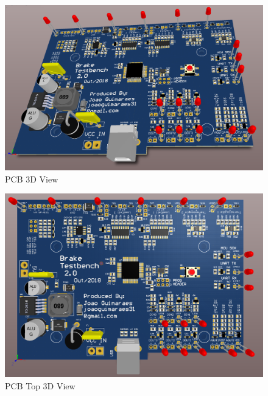 		\begin{figure}[htbp]
			\centering
			\includegraphics[scale=0.7]{figuras/fig-pcb-print-diagonal.png}
			\caption{PCB 3D View}
			\label{fig:pcb-print-diagonal}
		\end{figure}

		\begin{figure}[htbp]
			\centering
			\includegraphics[scale=0.8]{figuras/fig-pcb-print-top.png}
			\caption{PCB Top 3D View}
			\label{fig:pcb-print-top}
		\end{figure}

